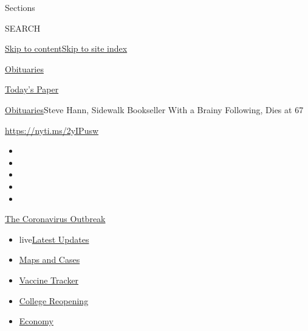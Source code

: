 Sections

SEARCH

\protect\hyperlink{site-content}{Skip to
content}\protect\hyperlink{site-index}{Skip to site index}

\href{https://www.nytimes.com/section/obituaries}{Obituaries}

\href{https://myaccount.nytimes.com/auth/login?response_type=cookie\&client_id=vi}{}

\href{https://www.nytimes.com/section/todayspaper}{Today's Paper}

\href{/section/obituaries}{Obituaries}\textbar{}Steve Hann, Sidewalk
Bookseller With a Brainy Following, Dies at 67

\url{https://nyti.ms/2yIPusw}

\begin{itemize}
\item
\item
\item
\item
\item
\end{itemize}

\href{https://www.nytimes.com/news-event/coronavirus?action=click\&pgtype=Article\&state=default\&region=TOP_BANNER\&context=storylines_menu}{The
Coronavirus Outbreak}

\begin{itemize}
\tightlist
\item
  live\href{https://www.nytimes.com/2020/08/03/world/coronavirus-covid-19.html?action=click\&pgtype=Article\&state=default\&region=TOP_BANNER\&context=storylines_menu}{Latest
  Updates}
\item
  \href{https://www.nytimes.com/interactive/2020/us/coronavirus-us-cases.html?action=click\&pgtype=Article\&state=default\&region=TOP_BANNER\&context=storylines_menu}{Maps
  and Cases}
\item
  \href{https://www.nytimes.com/interactive/2020/science/coronavirus-vaccine-tracker.html?action=click\&pgtype=Article\&state=default\&region=TOP_BANNER\&context=storylines_menu}{Vaccine
  Tracker}
\item
  \href{https://www.nytimes.com/2020/08/02/us/covid-college-reopening.html?action=click\&pgtype=Article\&state=default\&region=TOP_BANNER\&context=storylines_menu}{College
  Reopening}
\item
  \href{https://www.nytimes.com/live/2020/08/03/business/stock-market-today-coronavirus?action=click\&pgtype=Article\&state=default\&region=TOP_BANNER\&context=storylines_menu}{Economy}
\end{itemize}

